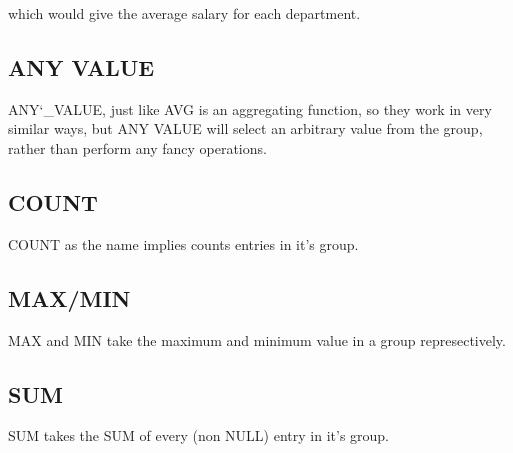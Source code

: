 \documentclass[10pt, english]{article}
\begin{document}
which would give the average salary for each department.

\subsection{ANY VALUE}
ANY\char`_VALUE, just like AVG is an aggregating function, so they work in very similar ways, but ANY VALUE will select an arbitrary value from the group, rather than 
perform any fancy operations.

\subsection{COUNT}
COUNT as the name implies counts entries in it's group.

\subsection{MAX/MIN}
MAX and MIN take the maximum and minimum value in a group represectively.

\subsection{SUM}
SUM takes the SUM of every (non NULL) entry in it's group.
\end{document}
